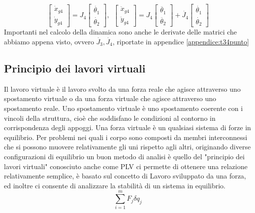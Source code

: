 \begin{equation*}
	\begin{bmatrix}
		\dot{x}_{g4} \\ \dot{y}_{g4}
	\end{bmatrix} = J_4 \begin{bmatrix}
		\dot{\theta_1} \\ \dot{\theta_2}
	\end{bmatrix} , \ \ 
	\begin{bmatrix}
		\ddot{x}_{g4} \\ \ddot{y}_{g4}
	\end{bmatrix} = J_4 \begin{bmatrix}
		\ddot{\theta_1} \\ \ddot{\theta_2}
	\end{bmatrix} + \dot{J_4} \begin{bmatrix}
		\dot{\theta_1} \\ \dot{\theta_2}
	\end{bmatrix}
\end{equation*}
Importanti nel calcolo della dinamica sono anche le derivate delle matrici che abbiamo appena visto, ovvero $\dot{J_3}, \dot{J_4}$,  riportate in appendice \ref{appendice:t34punto}
\subsection{Principio dei lavori virtuali}
Il lavoro virtuale è il lavoro svolto da una forza reale che agisce attraverso uno spostamento virtuale o da una forza virtuale che agisce attraverso uno spostamento reale.
Uno spostamento virtuale è uno spostamento coerente con i vincoli della struttura, cioè che soddisfano le condizioni al contorno in corrispondenza degli appoggi.
Una forza virtuale è un qualsiasi sistema di forze in equilibrio.
Per problemi nei quali i corpo sono composti da membri interconnessi che si possono muovere relativamente gli uni rispetto agli altri, originando diverse configurazioni di equilibrio un buon metodo di analisi è quello del "principio dei lavori virtuali" conosciuto anche come PLV ci permette di ottenere una relazione relativamente semplice, è basato sul concetto di Lavoro sviluppato da una forza, ed inoltre ci consente di analizzare la stabilità di un sistema in equilibrio.
\begin{equation}
    \sum_{i=1}^m F_j\delta q_j\label{eq:din}
\end{equation}
